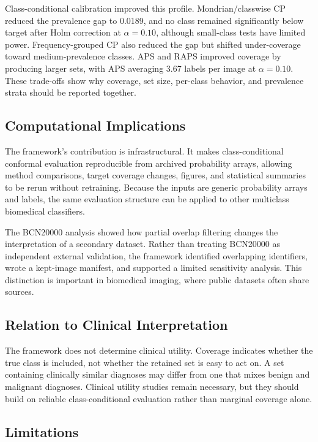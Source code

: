 ﻿\documentclass[preprint,12pt]{elsarticle}
\begin{document}
Class-conditional calibration improved this profile. Mondrian/classwise CP reduced the prevalence gap to 0.0189, and no class remained significantly below target after Holm correction at $\alpha=0.10$, although small-class tests have limited power. Frequency-grouped CP also reduced the gap but shifted under-coverage toward medium-prevalence classes. APS and RAPS improved coverage by producing larger sets, with APS averaging 3.67 labels per image at $\alpha=0.10$. These trade-offs show why coverage, set size, per-class behavior, and prevalence strata should be reported together.

\subsection{Computational Implications}

The framework's contribution is infrastructural. It makes class-conditional conformal evaluation reproducible from archived probability arrays, allowing method comparisons, target coverage changes, figures, and statistical summaries to be rerun without retraining. Because the inputs are generic probability arrays and labels, the same evaluation structure can be applied to other multiclass biomedical classifiers.

The BCN20000 analysis showed how partial overlap filtering changes the interpretation of a secondary dataset. Rather than treating BCN20000 as independent external validation, the framework identified overlapping identifiers, wrote a kept-image manifest, and supported a limited sensitivity analysis. This distinction is important in biomedical imaging, where public datasets often share sources.

\subsection{Relation to Clinical Interpretation}

The framework does not determine clinical utility. Coverage indicates whether the true class is included, not whether the retained set is easy to act on. A set containing clinically similar diagnoses may differ from one that mixes benign and malignant diagnoses. Clinical utility studies remain necessary, but they should build on reliable class-conditional evaluation rather than marginal coverage alone.

\subsection{Limitations}
\end{document}
